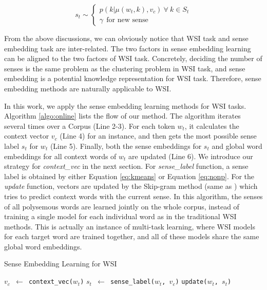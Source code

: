 \documentclass[11pt]{article}
\begin{document}
\begin{equation} \label{eq:nonp}
s_t  \sim \begin{cases}
               p(k|\mu(w_t,k),v_c)~\forall~k \in S_t \\
               \gamma~~\text{for new sense}
            \end{cases}
\end{equation}

From the above discussions, we can obviously notice that WSI task and sense embedding task are inter-related. The two factors in sense embedding learning can be aligned to the two factors of WSI task. Concretely, deciding the number of senses is the same problem as the clustering problem in WSI task, and sense embedding is a potential knowledge representation for WSI task.
Therefore, sense embedding methods are naturally applicable to WSI.

In this work, we apply the sense embedding learning methods for WSI tasks. Algorithm \ref{algo:online} lists the flow of our method. The algorithm iterates several times over a Corpus (Line 2-3).
For each token $w_t$, 
it calculates the context vector $v_c$ (Line 4) for an instance, 
and then gets the most possible sense label $s_t$ for $w_t$ (Line 5). 
Finally, both the sense embeddings for $s_t$ and global word embeddings for all context words of $w_t$ are updated (Line 6).
We introduce our strategy for \emph{context\_vec} in the next section.
For \emph{sense\_label} function, a sense label is obtained by either Equation \ref{eq:kmeans} or Equation \ref{eq:nonp}.
For the \emph{update} function, vectors are updated by the Skip-gram method (same as ) which tries to predict context words with the current sense. 
In this algorithm, the senses of all polysemous words are learned jointly on the whole corpus, instead of training a single model for each individual word as in the traditional WSI methods. 
This is actually an instance of multi-task learning, where WSI models for each target word are trained together, and all of these models share the same global word embeddings.

\begin{algorithm}[t]
  \caption{\small{Sense Embedding Learning for WSI}}\label{algo:online}
  \begin{algorithmic}[1]  
        \State\texttt{$v_c$ $\leftarrow$ context\_vec($w_t$)}
        \State\texttt{$s_t$ $\leftarrow$ sense\_label($w_t$, $v_c$)}
        \State\texttt{update($w_t$, $s_t$)}
      \EndFor
    \EndFor
    \EndProcedure
  \end{algorithmic}
\end{algorithm}
\end{document}
